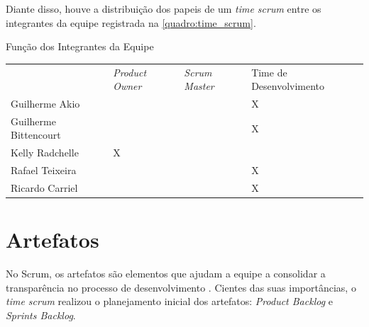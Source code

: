 \documentclass[
	12pt,				%
	openany,			%
	oneside,			%
	a4paper,			%
	english,			%
	french,				%
	spanish,			%
	brazil				%
	]{abntex2}
\begin{document}
Diante disso, houve a distribuição dos papeis de um \textit{time scrum} entre os integrantes da equipe registrada na \autoref{quadro:time_scrum}.
%
\begin{quadro}[H]
	\centering
	\caption{Função dos Integrantes da Equipe}
	\label{quadro:time_scrum}
	\begin{tabular}{|>{\centering\arraybackslash}m{3.2cm}|>{\centering\arraybackslash}m{3.5cm}|>{\centering\arraybackslash}m{3.5cm}|>{\centering\arraybackslash}m{4cm}|}
		\hline
		\multirow{2}{*}{\textbf{Integrante}} & \multicolumn{3}{c|}{\textbf{Função}} \\ \cline{2-4}
		&\textit{Product Owner} & \textit{Scrum Master} & Time de Desenvolvimento \\ \hline 
		 Guilherme Akio & & & X \\ \hline Guilherme Bittencourt & & & X \\ \hline Kelly Radchelle & X & & \\ \hline Rafael Teixeira & & & X \\ \hline Ricardo Carriel & & & X \\ \hline
	\end{tabular}
\end{quadro}

\section{Artefatos}
No Scrum,  os artefatos são elementos que ajudam a equipe a consolidar a transparência no processo de desenvolvimento  \cite{scrumguide}. Cientes das suas importâncias, o \textit {time scrum} realizou o planejamento inicial dos artefatos:  \textit {Product Backlog} e \textit {Sprints Backlog}.
%
\end{document}
